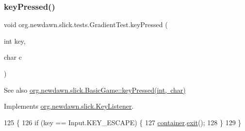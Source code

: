 \mbox{\label{classorg_1_1newdawn_1_1slick_1_1tests_1_1_gradient_test_a66122224e60b5482cc4706d35886ee57}} 
\subsubsection{\texorpdfstring{key\+Pressed()}{keyPressed()}}
{\footnotesize\ttfamily void org.\+newdawn.\+slick.\+tests.\+Gradient\+Test.\+key\+Pressed (\begin{DoxyParamCaption}\item[{int}]{key,  }\item[{char}]{c }\end{DoxyParamCaption})\hspace{0.3cm}{\ttfamily [inline]}}

\begin{DoxySeeAlso}{See also}
\mbox{\hyperlink{classorg_1_1newdawn_1_1slick_1_1_basic_game_a4fbb3345b5abf5ddd54a99466d07f02f}{org.\+newdawn.\+slick.\+Basic\+Game\+::key\+Pressed(int, char)}} 
\end{DoxySeeAlso}


Implements \mbox{\hyperlink{interfaceorg_1_1newdawn_1_1slick_1_1_key_listener_ac0b0568a21ef486c4f51382614c196ef}{org.\+newdawn.\+slick.\+Key\+Listener}}.


\begin{DoxyCode}
125                                             \{
126         \textcolor{keywordflow}{if} (key == Input.KEY\_ESCAPE) \{
127             \mbox{\hyperlink{classorg_1_1newdawn_1_1slick_1_1tests_1_1_gradient_test_ae50800331ae38b8083556139b8d7d6ef}{container}}.\mbox{\hyperlink{classorg_1_1newdawn_1_1slick_1_1_game_container_a6d888463695fe3aac4123e72ac14480f}{exit}}();
128         \}
129     \}
\end{DoxyCode}
\mbox{\label{classorg_1_1newdawn_1_1slick_1_1tests_1_1_gradient_test_a7ac85d4e961767d567964885845763be}} 
